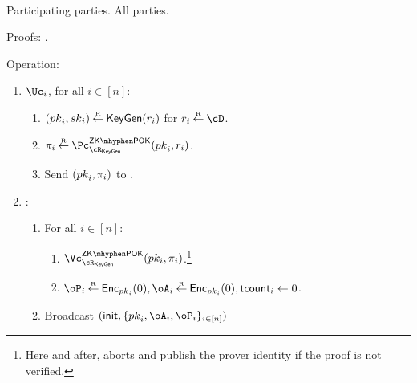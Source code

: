 \begin{protocol}~\label{prot:ConfidentialTransactions:Init}
	

	\item[Participating parties.] All parties.
			
			
	\item[Proofs:]   \piZKPOK{\rKeyGen}. 
	
	
			
\item[Operation:] ~
			
			
			\begin{enumerate}
				
				\item   $\Uc_i$, for  all $i\in [n]$:
				\begin{enumerate}
					\item  $({pk}_i,{sk}_i) \mathbin{\stackrel{\mbox{\tiny R}}{\leftarrow}} \mathsf{KeyGen}(r_i)$ for $r_i \getsr \cD$.
					
					
					\item  $\pi_i \getsr \pZKPOK{\rKeyGen}(\pk_i,r_i)$.  
					
					\item Send $({pk}_i,\pi_i)$ to \Cc.
					
					
				\end{enumerate}
				
				\item \Cc: ~
				
				\begin{enumerate}
				
				\item For all $i\in [n]$: 
				
				\begin{enumerate}
					\item 	 $\vZKPOK{\rKeyGen}(pk_i,\pi_i)$.\footnote{Here and after,  \Cc aborts and publish the prover identity if the   proof is not verified.}
					
					\item $\oP_i\getsr \Enc_{\pk_i}(0),\oA_i\getsr \Enc_{\pk_i}(0),\tcount_i 
					\asn 0$.  
					
			
				\end{enumerate}
			
		\item Broadcast $(\init,\sset{\pk_i,\oA_i,\oP_i}_{i\in [n]})$
				\end{enumerate}								
			\end{enumerate}
\end{protocol}

